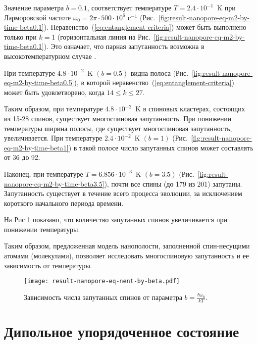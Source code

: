 Значение параметра $b = 0.1$, соответствует температуре ${T= 2.4\cdot 10^{-1}}$~K при Ларморовской частоте $\omega_0 = 2\pi\cdot 500\cdot10^6$ с$^{-1}$ (Рис.~\ref{fig:result-nanopore-eq-m2-by-time-beta0.1}).
Неравенство~(\ref{eq:entanglement-criteria}) может быть выполнено только при $k=1$ (горизонтальная линия на Рис.~\ref{fig:result-nanopore-eq-m2-by-time-beta0.1}).
Это означает, что парная запутанность возможна в высокотемпературном случае \cite{Feldman2012}.

При температуре ${4.8\cdot10^{-2}}$~K $(b=0.5)$ видна полоса (Рис.~\ref{fig:result-nanopore-eq-m2-by-time-beta0.5}), в которой неравенство~(\ref{eq:entanglement-criteria}) может быть удовлетворено, когда $14 \leq k \leq 27$.

Таким образом, при температуре ${4.8\cdot10^{-2}}$~K в спиновых кластерах, состоящих из 15-28 спинов, существует многоспиновая запутанность. При понижении температуры ширина полосы, где существует многоспиновая запутанность, увеличивается. При температуре ${2.4\cdot10^{-2}}$~K $(b=1)$ (Рис.~\ref{fig:result-nanopore-eq-m2-by-time-beta1}) в такой полосе число запутанных спинов может составлять от 36 до 92.

Наконец, при температуре ${T= 6.856\cdot10^{-3}}$~K $(b=3.5)$ (Рис.~\ref{fig:result-nanopore-eq-m2-by-time-beta3.5}), почти все спины (до 179 из 201) запутаны. Запутанность существует в течение всего процесса эволюции, за исключением короткого начального периода времени.

На Рис.\ref{fig:result-nanopore-eq-nent-by-beta} показано, что количество запутанных спинов увеличивается при понижении температуры.


Таким образом, предложенная модель нанополости, заполненной спин-несущими атомами (молекулами), позволяет исследовать многоспиновую запутанность и ее зависимость от температуры.

\begin{figure}[H]
  \centering
  \texttt{[image: result-nanopore-eq-nent-by-beta.pdf]}
  \caption{Зависимость числа запутанных спинов от параметра  $b = \frac{\hbar\omega_0}{kT} $.}
  \label{fig:result-nanopore-eq-nent-by-beta}
\end{figure}



\section{Дипольное упорядоченное состояние}
\label{sec:1}


